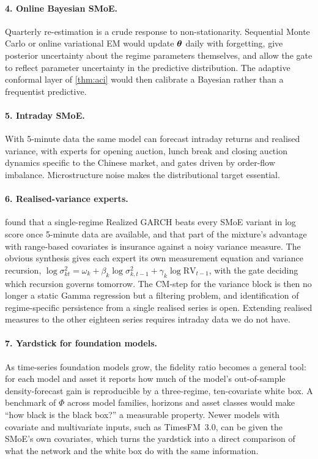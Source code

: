 \paragraph{4. Online Bayesian SMoE.}
Quarterly re-estimation is a crude response to non-stationarity. Sequential Monte Carlo or online
variational EM would update $\bm{\theta}$ daily with forgetting, give posterior uncertainty about the
regime parameters themselves, and allow the gate to reflect parameter uncertainty in the predictive
distribution. The adaptive conformal layer of \cref{thm:aci} would then calibrate a Bayesian rather
than a frequentist predictive.

\paragraph{5. Intraday SMoE.}
With 5-minute data the same model can forecast intraday returns and realised variance, with experts
for opening auction, lunch break and closing auction dynamics specific to the Chinese market, and gates
driven by order-flow imbalance. Microstructure noise makes the distributional target essential.

\paragraph{6. Realised-variance experts.}
 found that a single-regime Realized GARCH beats every SMoE variant in log score once
5-minute data are available, and that part of the mixture's advantage with range-based covariates is
insurance against a noisy variance measure. The obvious synthesis gives each expert its own
measurement equation and variance recursion,
$\log\sigma^2_{kt}=\omega_k+\beta_k\log\sigma^2_{k,t-1}+\gamma_k\log\mathrm{RV}_{t-1}$, with the
gate deciding which recursion governs tomorrow. The CM-step for the variance block is then no longer
a static Gamma regression but a filtering problem, and identification of regime-specific persistence
from a single realised series is open. Extending realised measures to the other eighteen series
requires intraday data we do not have.

\paragraph{7. Yardstick for foundation models.}
As time-series foundation models grow, the fidelity ratio becomes a general tool: for each model and
asset it reports how much of the model's out-of-sample density-forecast gain is reproducible by a
three-regime, ten-covariate white box. A benchmark of $\Phi$ across model families, horizons and
asset classes would make ``how black is the black box?'' a measurable property. Newer models with
covariate and multivariate inputs, such as TimesFM~3.0, can be given the SMoE's own covariates, which
turns the yardstick into a direct comparison of what the network and the white box do with the same
information.

